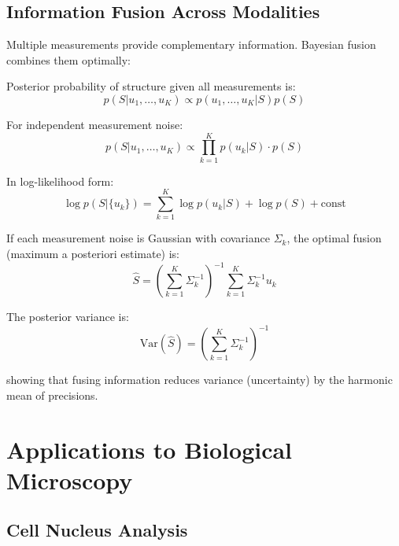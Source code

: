 \documentclass[twocolumn,11pt]{article}
\begin{document}
\subsection{Information Fusion Across Modalities}

Multiple measurements provide complementary information. Bayesian fusion combines them optimally:

\begin{definition}
Posterior probability of structure given all measurements is:
\begin{equation}
p(S | u_1, \ldots, u_K) \propto p(u_1, \ldots, u_K | S) p(S)
\end{equation}

For independent measurement noise:
\begin{equation}
p(S | u_1, \ldots, u_K) \propto \prod_{k=1}^K p(u_k | S) \cdot p(S)
\end{equation}

In log-likelihood form:
\begin{equation}
\log p(S | \{u_k\}) = \sum_{k=1}^K \log p(u_k | S) + \log p(S) + \text{const}
\end{equation}
\end{definition}

\begin{theorem}
If each measurement noise is Gaussian with covariance $\Sigma_k$, the optimal fusion (maximum a posteriori estimate) is:
\begin{equation}
\hat{S} = \left(\sum_{k=1}^K \Sigma_k^{-1}\right)^{-1} \sum_{k=1}^K \Sigma_k^{-1} u_k
\end{equation}

The posterior variance is:
\begin{equation}
\text{Var}(\hat{S}) = \left(\sum_{k=1}^K \Sigma_k^{-1}\right)^{-1}
\end{equation}

showing that fusing information reduces variance (uncertainty) by the harmonic mean of precisions.
\end{theorem}

\section{Applications to Biological Microscopy}

\subsection{Cell Nucleus Analysis}
\end{document}
